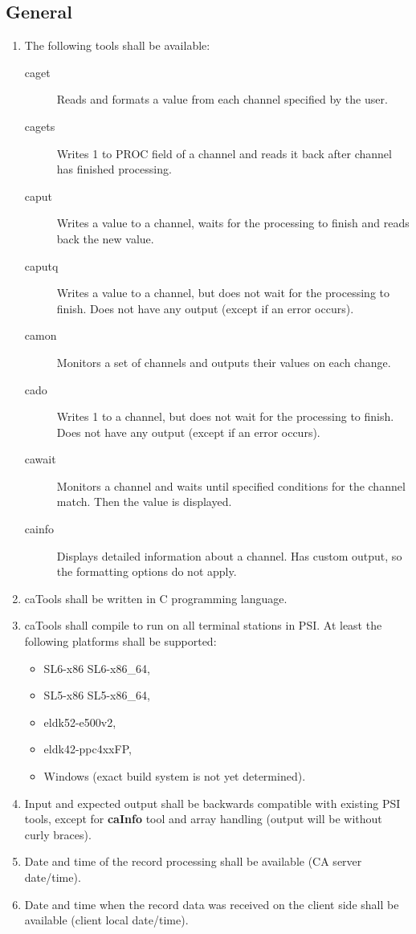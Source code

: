 \documentclass[12pt,a4paper]{article}
\begin{document}
\subsection{General}
\begin{enumerate}
	\item The following tools shall be available:
	\begin{description}
		\item [caget] Reads and formats a value from each channel specified by the user. 
		\item [cagets] Writes 1 to PROC field of a channel and reads it back after channel has finished processing.
		\item [caput] Writes a value to a channel, waits for the processing to finish and reads back the new value.
		\item [caputq] Writes a value to a channel, but does not wait for the processing to finish. Does not have any output (except if an error occurs).
		\item [camon] Monitors a set of channels and outputs their values on each change.
		\item [cado] Writes 1 to a channel, but does not wait for the processing to finish. Does not have any output (except if an error occurs).
		\item [cawait] Monitors a channel and waits until specified conditions for the channel match. Then the value is displayed.
		\item [cainfo] Displays detailed information about a channel. Has custom output, so the formatting options do not apply.
	\end{description}
	\item caTools shall be written in C programming language.
	\item caTools shall compile to run on all terminal stations in PSI. At least the following platforms shall be supported:
	\begin{itemize}
		\item SL6-x86 SL6-x86\_64,
		\item SL5-x86 SL5-x86\_64,
		\item eldk52-e500v2,
		\item eldk42-ppc4xxFP,
		\item Windows (exact build system is not yet determined).
	\end{itemize}
	\item Input and expected output shall be backwards compatible with existing PSI tools, except for \textbf{caInfo} tool and array handling (output will be without curly braces).
	\item Date and time of the record processing shall be available (CA server date/time).
	\item Date and time when the record data was received on the client side shall be available (client local date/time).
\end{enumerate}
\end{document}
